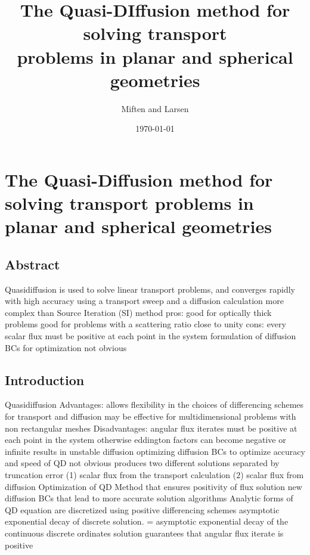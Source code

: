 \documentclass{report}
\begin{document}
\title{The Quasi-DIffusion method for solving transport\\
         problems in planar and spherical geometries}
\author{Miften and Larsen}
\date{\today}
\setcounter{secnumdepth}{0}
\section{The Quasi-Diffusion method for solving transport problems in planar and spherical geometries}
\subsection{Abstract}
\begin{outline}
 \1 Quasidiffusion is used to solve linear transport problems, and converges rapidly with high accuracy
   \2 using a transport sweep
   \2 and a diffusion calculation 
 \1 more complex than Source Iteration (SI) method
 \1 pros:
   \2 good for optically thick problems 
   \2 good for problems with a scattering ratio close to unity
 \1 cons: 
   \2 every scalar flux must be positive at each point in the system
   \2 formulation of diffusion BCs for optimization not obvious
\end{outline}
\subsection{Introduction}
\begin{outline}
 \1 Quasidiffusion Advantages:
   \2 allows flexibility in the choices of differencing schemes for transport and diffusion
   \2 may be effective for multidimensional problems with non rectangular meshes
 \1 Disadvantages:
   \2 angular flux iterates must be positive at each point in the system
     \3 otherwise eddington factors can become negative or infinite
       \4 results in unstable diffusion
   \2 optimizing diffusion BCs to optimize accuracy and speed of QD not obvious
   \2 produces two different solutions separated by truncation error
     \3 (1) scalar flux from the transport calculation
     \3 (2) scalar flux from diffusion
 \1 Optimization of QD
   \2 Method that ensures positivity of flux solution
   \2 new diffusion BCs that lead to more accurate solution algorithms
   \2 Analytic forms of QD equation are discretized using positive differencing schemes
     \3 asymptotic exponential decay of discrete solution.  = asymptotic exponential decay of the continuous discrete ordinates solution
     \3 guarantees that angular flux iterate is positive
\end{outline}
\end{document}
